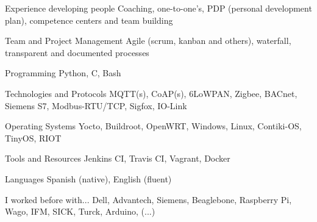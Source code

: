 

\begin{cvskills}

  \cvskill
    {Experience developing people} %
    {Coaching, one-to-one's, PDP (personal development plan), competence centers and team building} %

  \cvskill
    {Team and Project Management } %
    {Agile (scrum, kanban and others), waterfall, transparent and documented processes} %

  \cvskill
    {Programming} %
    {Python, C, Bash} %

  \cvskill
    {Technologies and Protocols} %
    {MQTT(s), CoAP(s), 6LoWPAN, Zigbee, BACnet, Siemens S7, Modbus-RTU/TCP, Sigfox, IO-Link} %

  \cvskill
    {Operating Systems} %
    {Yocto, Buildroot, OpenWRT, Windows, Linux, Contiki-OS, TinyOS, RIOT} %

  \cvskill
    {Tools and Resources} %
    {Jenkins CI, Travis CI, Vagrant, Docker} %

  \cvskill
    {Languages} %
    {Spanish (native), English (fluent)} %

  \cvskill
    {I worked before with...} %
    {Dell, Advantech, Siemens, Beaglebone, Raspberry Pi, Wago, IFM, SICK, Turck, Arduino, (...)} %

\end{cvskills}
